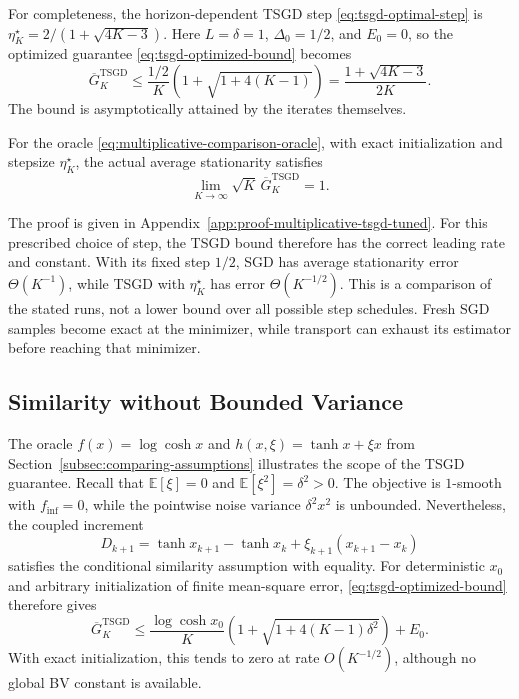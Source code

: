 For completeness, the horizon-dependent TSGD step
\eqref{eq:tsgd-optimal-step} is
$\eta_K^\star=2/(1+\sqrt{4K-3})$. Here $L=\delta=1$,
$\Delta_0=1/2$, and $E_0=0$, so the optimized guarantee
\eqref{eq:tsgd-optimized-bound} becomes
\begin{equation}
\label{eq:multiplicative-tsgd-tuned-bound}
\overline G_K^{\mathrm{TSGD}}
\leq\frac{1/2}{K}\left(1+\sqrt{1+4(K-1)}\right)
=\frac{1+\sqrt{4K-3}}{2K}.
\end{equation}
The bound is asymptotically attained by the iterates themselves.
\begin{lemma}
\label{lem:multiplicative-tsgd-tuned-exact}
For the oracle \eqref{eq:multiplicative-comparison-oracle}, with
exact initialization and stepsize $\eta_K^\star$, the actual average
stationarity satisfies
\[
\lim_{K\to\infty}\sqrt K\,
\overline G_K^{\mathrm{TSGD}}=1.
\]
\end{lemma}
The proof is given in Appendix~\ref{app:proof-multiplicative-tsgd-tuned}.
For this prescribed choice of step, the TSGD bound therefore has the
correct leading rate and constant. With its fixed step $1/2$, SGD
has average stationarity error $\Theta(K^{-1})$, while TSGD with
$\eta_K^\star$ has error $\Theta(K^{-1/2})$. This is a comparison
of the stated runs, not a lower bound over all possible step
schedules. Fresh SGD samples become exact at the minimizer, while
transport can exhaust its estimator before reaching that minimizer.

\subsection{Similarity without Bounded Variance}
\label{subsec:similarity-without-bv}

The oracle $f(x)=\log\cosh x$ and
$h(x,\xi)=\tanh x+\xi x$ from
Section~\ref{subsec:comparing-assumptions} illustrates the scope of
the TSGD guarantee. Recall that $\mathbb E[\xi]=0$ and
$\mathbb E[\xi^2]=\delta^2>0$. The objective is $1$-smooth with
$f_{\inf}=0$, while the pointwise noise variance $\delta^2x^2$ is
unbounded. Nevertheless, the coupled increment
\[
D_{k+1}=\tanh x_{k+1}-\tanh x_k
        +\xi_{k+1}(x_{k+1}-x_k)
\]
satisfies the conditional similarity assumption with equality.
For deterministic $x_0$ and arbitrary initialization of finite
mean-square error, \eqref{eq:tsgd-optimized-bound} therefore gives
\begin{equation}
\label{eq:logcosh-tsgd-guarantee}
\overline G_K^{\mathrm{TSGD}}
\leq\frac{\log\cosh x_0}{K}
       \left(1+\sqrt{1+4(K-1)\delta^2}\right)+E_0.
\end{equation}
With exact initialization, this tends to zero at rate
$O(K^{-1/2})$, although no global BV constant is available.

